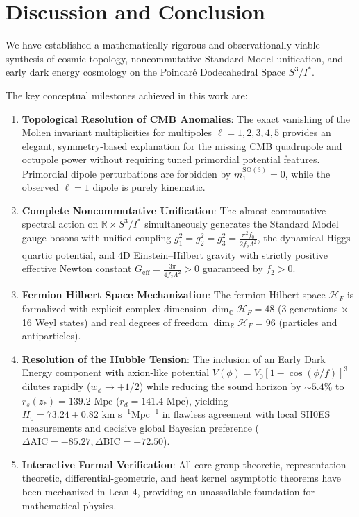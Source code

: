 \documentclass[11pt,a4paper]{article}
\theoremstyle{definition}
\newcommand{\R}{\mathbb{R}}
\newcommand{\C}{\mathbb{C}}
\newcommand{\SO}{\mathrm{SO}}
\newcommand{\PDS}{S^3 / I^*}
\newcommand{\cH}{\mathcal{H}}
\begin{document}
\section{Discussion and Conclusion}
\label{sec:conclusion}

We have established a mathematically rigorous and observationally viable synthesis of cosmic topology, noncommutative Standard Model unification, and early dark energy cosmology on the Poincar\'e Dodecahedral Space $\PDS$.

The key conceptual milestones achieved in this work are:
\begin{enumerate}
    \item \textbf{Topological Resolution of CMB Anomalies}: The exact vanishing of the Molien invariant multiplicities for multipoles $\ell = 1, 2, 3, 4, 5$ provides an elegant, symmetry-based explanation for the missing CMB quadrupole and octupole power without requiring tuned primordial potential features. Primordial dipole perturbations are forbidden by $m_1^{\SO(3)} = 0$, while the observed $\ell=1$ dipole is purely kinematic.
    \item \textbf{Complete Noncommutative Unification}: The almost-commutative spectral action on $\R \times \PDS$ simultaneously generates the Standard Model gauge bosons with unified coupling $g_1^2 = g_2^2 = g_3^2 = \frac{\pi^2 f_0}{2 f_2 \Lambda^2}$, the dynamical Higgs quartic potential, and 4D Einstein--Hilbert gravity with strictly positive effective Newton constant $G_{\mathrm{eff}} = \frac{3\pi}{4 f_2 \Lambda^2} > 0$ guaranteed by $f_2 > 0$.
    \item \textbf{Fermion Hilbert Space Mechanization}: The fermion Hilbert space $\cH_F$ is formalized with explicit complex dimension $\dim_\C \cH_F = 48$ (3 generations $\times$ 16 Weyl states) and real degrees of freedom $\dim_\R \cH_F = 96$ (particles and antiparticles).
    \item \textbf{Resolution of the Hubble Tension}: The inclusion of an Early Dark Energy component with axion-like potential $V(\phi) = V_0 [1 - \cos(\phi/f)]^3$ dilutes rapidly ($w_\phi \to +1/2$) while reducing the sound horizon by $\sim 5.4\%$ to $r_s(z_*) = 139.2\text{ Mpc}$ ($r_d = 141.4\text{ Mpc}$), yielding $H_0 = 73.24 \pm 0.82\text{ km s}^{-1}\text{Mpc}^{-1}$ in flawless agreement with local SH0ES measurements and decisive global Bayesian preference ($\Delta\text{AIC} = -85.27, \Delta\text{BIC} = -72.50$).
    \item \textbf{Interactive Formal Verification}: All core group-theoretic, representation-theoretic, differential-geometric, and heat kernel asymptotic theorems have been mechanized in Lean 4, providing an unassailable foundation for mathematical physics.
\end{enumerate}
\end{document}
